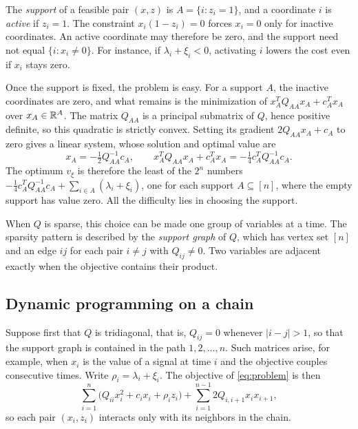 The \emph{support} of a feasible pair $(x,z)$ is $A=\{i:z_i=1\}$, and a
coordinate $i$ is \emph{active} if $z_i=1$. The constraint
$x_i(1-z_i)=0$ forces $x_i=0$ only for inactive coordinates. An active
coordinate may therefore be zero, and the support need not equal
$\{i:x_i\ne0\}$. For instance, if $\lambda_i+\xi_i<0$, activating $i$
lowers the cost even if $x_i$ stays zero.

Once the support is fixed, the problem is easy. For a support $A$, the
inactive coordinates are zero, and what remains is the minimization of
$x_A^TQ_{AA}x_A+c_A^Tx_A$ over $x_A\in\mathbb R^A$. The matrix $Q_{AA}$ is a
principal submatrix of $Q$, hence positive definite, so this quadratic is
strictly convex. Setting its gradient $2Q_{AA}x_A+c_A$ to zero gives a
linear system, whose solution and optimal value are
\[
 x_A=-\tfrac12Q_{AA}^{-1}c_A,\qquad
 x_A^TQ_{AA}x_A+c_A^Tx_A=-\tfrac14c_A^TQ_{AA}^{-1}c_A.
\]
The optimum $v_\xi$ is therefore the least of the $2^n$ numbers
$-\frac14c_A^TQ_{AA}^{-1}c_A+\sum_{i\in A}(\lambda_i+\xi_i)$, one for each
support $A\subseteq[n]$, where the empty support has value zero. All the
difficulty lies in choosing the support.

When $Q$ is sparse, this choice can be made one group of variables at a
time. The sparsity pattern is described by the \emph{support graph} of
$Q$, which has vertex set $[n]$ and an edge $ij$ for each pair $i\ne j$
with $Q_{ij}\ne0$. Two variables are adjacent exactly when the objective
contains their product.

\subsection{Dynamic programming on a chain}\label{sec:prelim-chain}
Suppose first that $Q$ is tridiagonal, that is, $Q_{ij}=0$ whenever
$|i-j|>1$, so that the support graph is contained in the path
$1,2,\ldots,n$. Such matrices arise, for example, when $x_i$ is the value
of a signal at time $i$ and the objective couples consecutive times.
Write $\rho_i=\lambda_i+\xi_i$. The objective of \eqref{eq:problem} is then
\begin{equation}\label{eq:chain-objective}
 \sum_{i=1}^n\bigl(Q_{ii}x_i^2+c_ix_i+\rho_iz_i\bigr)
 +\sum_{i=1}^{n-1}2Q_{i,i+1}x_ix_{i+1},
\end{equation}
so each pair $(x_i,z_i)$ interacts only with its neighbors in the chain.

